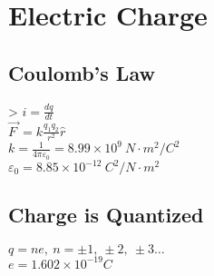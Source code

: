 \section*{Electric Charge}
\subsection*{Coulomb's Law}
> $i=\frac{dq}{dt}$\\
$\vec{F\:}=k\frac{q_1q_2}{r^2}\widehat{r}$\\
$k=\frac{1}{4\pi \varepsilon_0}=8.99\times 10^9\:N\cdot m^2/C^2$\\
$\varepsilon_0=8.85\times 10^{-12}\:C^2/N\cdot m^2$\\
\subsection*{Charge is Quantized}
$q=ne,\:n=\pm 1,\:\pm 2,\:\pm 3\dots $\\
$e=1.602\times 10^{-19}C$\\